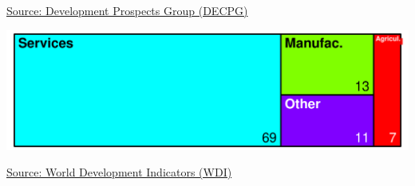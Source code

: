 \documentclass{article}\usepackage[]{graphicx}\usepackage[]{color}
\makeatletter
\def\maxwidth{ %
  \ifdim\Gin@nat@width>\linewidth
    \linewidth
  \else
    \Gin@nat@width
  \fi
}
\makeatother
\begin{document}
\begin{minipage}[b]{0.99\textwidth}
\begin{minipage}[b]{\textwidth}
\begin{minipage}[c]{0.49\textwidth}
{}



    \vspace*{-0.3cm}
    \raggedright{\footnotesize{\href{http://web.worldbank.org/WBSITE/EXTERNAL/EXTDEC/EXTDECPROSPECTS/0,,menuPK:476941~pagePK:51084723~piPK:51084722~theSitePK:476883,00.html}{Source: Development Prospects Group (DECPG)}}}
    \end{minipage}
    \begin{minipage}[c]{0.49\textwidth} %


{\centering \includegraphics[width=\maxwidth]{figure/GVA_Treemap-1} 

}



   \raggedright{\footnotesize{\href{http://data.worldbank.org/data-catalog/world-development indicators}{Source: World Development Indicators (WDI)}}}
    \end{minipage}
  \end{minipage}  
\end{minipage}   
 
\end{document}
